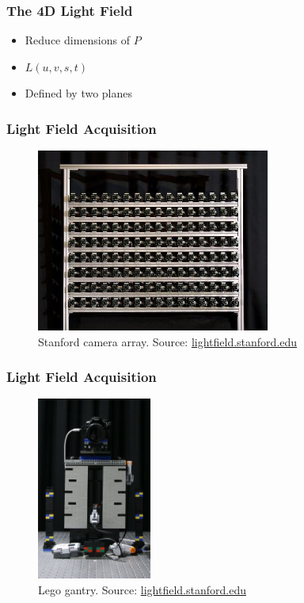\documentclass[12pt, compress]{beamer}
\begin{document}
\begin{frame}[fragile]
	\frametitle{The 4D Light Field}
	
	\begin{itemize}[<alert@+>]
		\item Reduce dimensions of $P$
		\item $L(u, v, s, t)$
		\item Defined by two planes
	\end{itemize}
	\begin{center}
	\end{center}
\end{frame}

\begin{frame}[fragile]
	\frametitle{Light Field Acquisition}
	
	\begin{figure}
		\includegraphics[height = 6cm]{images/stanford_camera_array_2.jpg}
		\caption*{Stanford camera array. Source: \href{http://lightfield.stanford.edu}{lightfield.stanford.edu}}
	\end{figure}
	
\end{frame}

\begin{frame}[fragile]
	\frametitle{Light Field Acquisition}
	
	\begin{figure}
		\includegraphics[height = 6cm]{images/lego_camera_gantry}
		\caption*{Lego gantry. Source: \href{http://lightfield.stanford.edu}{lightfield.stanford.edu}}
	\end{figure}
	
\end{frame}
\end{document}
